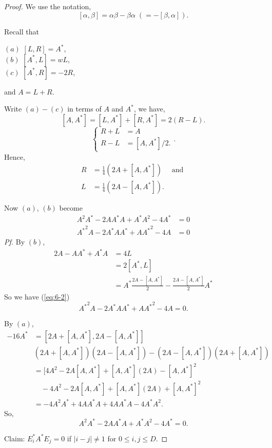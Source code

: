 \documentclass[
]{book}
\theoremstyle{definition}
\theoremstyle{definition}
\theoremstyle{definition}
\theoremstyle{definition}
\theoremstyle{remark}
\begin{document}
\begin{proof}
We use the notation,
\[[\alpha, \beta] = \alpha\beta - \beta\alpha \; (=-[\beta, \alpha]).\]

Recall that

\((a)\) \([L, R] = A^*\),\\
\((b)\) \([A^*, L] = wL\),\\
\((c)\) \([A^*, R] = -2R\),

and \(A = L + R\).

Write \((a) - (c)\) in terms of \(A\) and \(A^*\), we have,
\[[A, A^*] = [L, A^*]+ [R, A^*] = 2(R-L).\]
\[\begin{cases} R + L & = A\\
R-L & = [A,A^*]/2. \end{cases}.\]
Hence,
\begin{align}
R & = \frac{1}{4}(2A + [A, A^*]) \quad \text{ and }\\
L & = \frac{1}{4}(2A - [A, A^*]).
\end{align}

Now \((a)\), \((b)\) become
\begin{align}
A^2A^* - 2AA^*A + A^*A^2 - 4A^*  & = 0  \label{eq:6-1}\\
{A^*}^2A - 2A^*AA^* + A{A^*}^2 - 4A  & = 0 \label{eq:6-2}
\end{align}
\emph{Pf.} \quad By \((b)\),
\begin{align}
2A - AA^* + A^*A & = 4L\\
& = 2[A^*, L]\\
& = A^* \frac{2A - [A,A^*]}{2} - \frac{2A - [A, A^*]}{2}A^*
\end{align}
So we have (\eqref{eq:6-2})
\[
{A^*}^2A - 2A^*AA^* + A{A^*}^2 - 4A   = 0.
\]

By \((a)\),
\begin{align}
-16A^* & = [2A + [A, A^*], 2A - [A, A^*]]\\
& (2A + [A, A^*])(2A - [A, A^*]) - (2A - [A,A^*])(2A + [A, A^*])\\
& = [4A^2 - 2A[A, A^*] + [A, A^*](2A) - [A,A^*]^2\\
& \quad - 4A^2 - 2A[A, A^*] + [A, A^*](2A) + [A, A^*]^2\\
& = -4A^2A^* + 4AA^*A + 4AA^*A - 4A^*A^2.
\end{align}
So,
\[A^2A^* - 2AA^*A + A^*A^2 - 4A^* = 0.\]

Claim: \(E_i^*A^*E_j = 0\) if \(|i-j| \neq 1\) for \(0\leq i, j\leq D\).


\end{proof}
\end{document}
